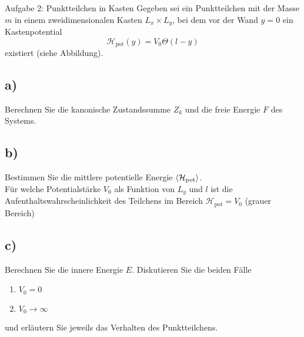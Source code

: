 \begin{aufgabe}{Aufgabe 2: Punktteilchen in Kasten}
    Gegeben sei ein Punktteilchen mit der Masse $m$ in einem zweidimensionalen Kasten $L_x \times L_y$,
    bei dem vor der Wand $y=0$ ein Kastenpotential
    \[
    \mathcal{H}_\text{pot}(y) = V_0\Theta(l-y)
    \]
    existiert (siehe Abbildung).

    \subsection{a)}
    Berechnen Sie die kanonische Zustandssumme $Z_k$ und die freie Energie $F$ des Systems.

    \subsection{b)}
    Bestimmen Sie die mittlere potentielle Energie $\left\langle\mathcal{H_\text{pot}}\right\rangle$.
    \\
    Für welche Potentialstärke $V_0$ als Funktion von $L_y$ und $l$ ist die Aufenthaltswahrscheinlichkeit des Teilchens im Bereich $\mathcal{H}_\text{pot} = V_0$ (grauer Bereich)

    \subsection{c)}
    Berechnen Sie die innere Energie $E$.
    Diskutieren Sie die beiden Fälle
    \begin{enumerate}
        \item $V_0 = 0$
        \item $V_0 \to \infty$
    \end{enumerate}
    und erläutern Sie jeweils das Verhalten des Punktteilchens.
\end{aufgabe}

